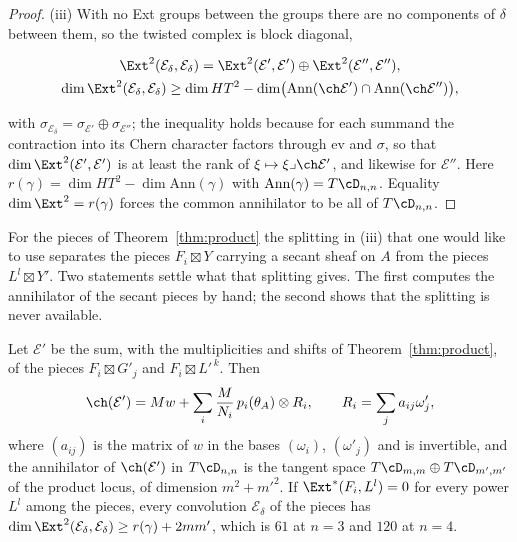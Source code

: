 \begin{proof}
(iii) With no Ext groups between the groups there are no components of $\delta$ between them, so the twisted complex is block diagonal,
\begin{widetext}
\begin{equation}\label{eq:blockdiag}
\begin{gathered}
\Ext^{2}(\mathcal{E}_{\delta},\mathcal{E}_{\delta})=\Ext^{2}(\mathcal{E}',\mathcal{E}')\oplus\Ext^{2}(\mathcal{E}'',\mathcal{E}''),\\
\dim\Ext^{2}(\mathcal{E}_{\delta},\mathcal{E}_{\delta})\ge\dim HT^{2}-\dim\bigl(\mathrm{Ann}(\ch\mathcal{E}')\cap\mathrm{Ann}(\ch\mathcal{E}'')\bigr),
\end{gathered}
\end{equation}
\end{widetext}
with $\sigma_{\mathcal{E}_{\delta}}=\sigma_{\mathcal{E}'}\oplus\sigma_{\mathcal{E}''}$; the inequality holds because for each summand the contraction into its Chern character factors through $\mathrm{ev}$ and $\sigma$, so that $\dim\Ext^{2}(\mathcal{E}',\mathcal{E}')$ is at least the rank of $\xi\mapsto\xi\lrcorner\ch\mathcal{E}'$, and likewise for $\mathcal{E}''$. Here $r(\gamma)=\dim HT^{2}-\dim\mathrm{Ann}(\gamma)$ with $\mathrm{Ann}(\gamma)=T\cD_{n,n}$. Equality $\dim\Ext^{2}=r(\gamma)$ forces the common annihilator to be all of $T\cD_{n,n}$.
\end{proof}

For the pieces of Theorem~\ref{thm:product} the splitting in (iii) that one would like to use separates the pieces $F_{i}\boxtimes Y$ carrying a secant sheaf on $A$ from the pieces $L^{l}\boxtimes Y'$. Two statements settle what that splitting gives. The first computes the annihilator of the secant pieces by hand; the second shows that the splitting is never available.

\begin{theorem}\label{thm:annihilator}
Let $\mathcal{E}'$ be the sum, with the multiplicities and shifts of Theorem~\ref{thm:product}, of the pieces $F_{i}\boxtimes G'_{j}$ and $F_{i}\boxtimes L'^{\,k}$. Then
\begin{equation}\label{eq:chEprime}
\ch(\mathcal{E}')=Mw+\sum_{i}\frac{M}{N_{i}}\,p_{i}(\theta_{A})\otimes R_{i},\qquad R_{i}=\sum_{j}a_{ij}\omega'_{j},
\end{equation}
where $(a_{ij})$ is the matrix of $w$ in the bases $(\omega_{i})$, $(\omega'_{j})$ and is invertible, and the annihilator of $\ch(\mathcal{E}')$ in $T\cD_{n,n}$ is the tangent space $T\cD_{m,m}\oplus T\cD_{m',m'}$ of the product locus, of dimension $m^{2}+m'^{2}$. If $\Ext^{*}(F_{i},L^{l})=0$ for every power $L^{l}$ among the pieces, every convolution $\mathcal{E}_{\delta}$ of the pieces has $\dim\Ext^{2}(\mathcal{E}_{\delta},\mathcal{E}_{\delta})\ge r(\gamma)+2mm'$, which is $61$ at $n=3$ and $120$ at $n=4$.
\end{theorem}

